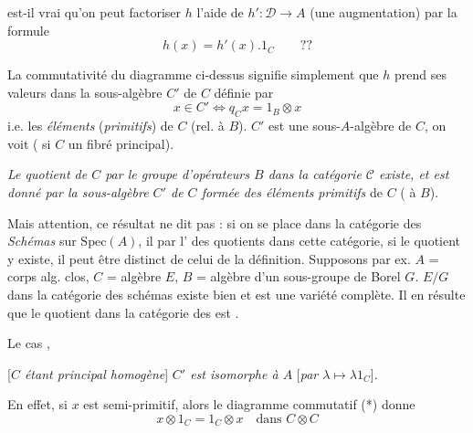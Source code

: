 \documentclass[11pt,a4paper]{article}
\begin{document}

est-il vrai qu'on peut factoriser $h$  l'aide de
$h' : \mathcal{D} \to A$ (une augmentation) par la formule
\[
h(x) = h'(x) . 1_C \qquad ??
\]

La commutativité du diagramme ci-dessus signifie simplement que $h$ prend
ses valeurs dans la sous-algèbre $C'$ de $C$ 
définie par
\[
x \in C' \iff q_C x = 1_B \otimes x
\]
i.e. les \emph{éléments}  (\emph{primitifs}) de $C$ (rel.
à $B$). $C'$ est une sous-$A$-algèbre de $C$, \ill{} on
voit  (\ill{} si $C$ \ill{} un fibré
principal).

\emph{Le quotient de $C$ par le groupe d'opérateurs $B$ dans la catégorie
$\mathcal{C}$ existe, et est donné par la sous-algèbre $C'$ de $C$ formée
des éléments}  \struck{\ill{}} \emph{primitifs} de $C$
( à $B$).


Mais attention, ce résultat ne dit pas  : si on se
place dans la catégorie des \emph{Schémas} sur $\mathrm{Spec}(A)$, il
\ill{} par l' des quotients dans cette catégorie,
\struck{\ill{}} si le quotient y existe, il peut être distinct de celui
\ill{} de la définition. Supposons par ex. $A$ = corps alg. clos,
$C$ = algèbre \ill{} \ill{}  $E$, $B$ = algèbre
\ill{} d'un sous-groupe de Borel $G$.  $E/G$ dans la
catégorie des schémas existe bien et est une variété complète. Il en
résulte que le quotient dans la catégorie des 
est .

Le cas , \struck{\ill{}}

\marginal{$\|$}
[\emph{$C$ étant principal homogène}]  \emph{$C'$ est
isomorphe à $A$} [\emph{par $\lambda \mapsto \lambda 1_C$}].

En effet, si $x$ est semi-primitif, alors le diagramme commutatif (*)
donne
\[
x \otimes 1_C = 1_C \otimes x \quad\text{dans } C \otimes C
\]

\end{document}
